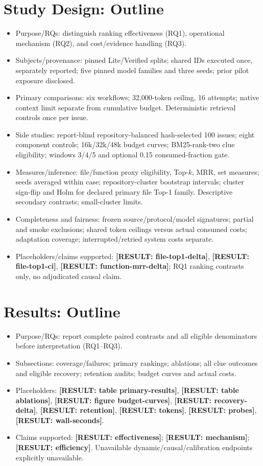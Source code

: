 \documentclass[letterpaper,journal]{IEEEtran}
\makeatletter
\newcommand{\resultslot}[1]{\textcolor{blue!65!black}{\textbf{[RESULT: #1]}}}
\newcommand{\res}[1]{\resultslot{#1}}
\newcommand{\resrange}[1]{\resultslot{#1}}
\newcommand{\claimslot}[1]{\resultslot{#1}}
\newcommand{\figslot}[1]{\resultslot{figure #1}}
\newcommand{\tabslot}[1]{\resultslot{table #1}}
\newcommand{\boundresult}[1]{\ifcsname result@#1\endcsname\csname result@#1\endcsname\else\PackageError{morph-results}{Missing result key #1}{Supply audited binding}\fi}
\newcommand{\res}[1]{\boundresult{#1}}
\newcommand{\resrange}[1]{\boundresult{#1}}
\newcommand{\claimslot}[1]{\boundresult{#1}}
\newcommand{\figslot}[1]{\boundresult{#1}}
\newcommand{\tabslot}[1]{\boundresult{#1}}
\makeatother
\begin{document}
\section{Study Design: Outline}\label{sec:study}
\begin{itemize}
\item Purpose/RQs: distinguish ranking effectiveness (RQ1), operational mechanism (RQ2), and cost/evidence handling (RQ3).
\item Subjects/provenance: pinned Lite/Verified splits; shared IDs executed once, separately reported; five pinned model families and three seeds; prior pilot exposure disclosed.
\item Primary comparisons: six workflows; 32,000-token ceiling, 16 attempts; native context limit separate from cumulative budget. Deterministic retrieval controls once per issue.
\item Side studies: report-blind repository-balanced hash-selected 100 issues; eight component controls; 16k/32k/48k budget curves; BM25-rank-two clue eligibility; windows 3/4/5 and optional 0.15 consumed-fraction gate.
\item Measures/inference: file/function proxy eligibility, Top-$k$, MRR, set measures; seeds averaged within case; repository-cluster bootstrap intervals; cluster sign-flip and Holm for declared primary file Top-1 family. Descriptive secondary contrasts; small-cluster limits.
\item Completeness and fairness: frozen source/protocol/model signatures; partial and smoke exclusions; shared token ceilings versus actual consumed costs; adaptation coverage; interrupted/retried system costs separate.
\item Placeholders/claims supported: \res{file-top1-delta}, \resrange{file-top1-ci}, \res{function-mrr-delta}; RQ1 ranking contrasts only, no adjudicated causal claim.
\end{itemize}

\section{Results: Outline}
\begin{itemize}
\item Purpose/RQs: report complete paired contrasts and all eligible denominators before interpretation (RQ1--RQ3).
\item Subsections: coverage/failures; primary rankings; ablations; all clue outcomes and eligible recovery; retention audits; budget curves and actual costs.
\item Placeholders: \tabslot{primary-results}, \tabslot{ablations}, \figslot{budget-curves}, \res{recovery-delta}, \res{retention}, \res{tokens}, \res{probes}, \res{wall-seconds}.
\item Claims supported: \claimslot{effectiveness}; \claimslot{mechanism}; \claimslot{efficiency}. Unavailable dynamic/causal/calibration endpoints explicitly unavailable.
\end{itemize}
\end{document}
